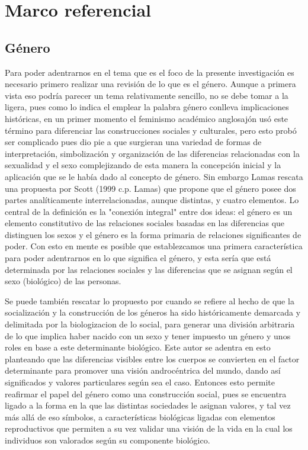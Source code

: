 \chapter{Marco referencial}\label{marcoreferencial}

\section{Género}

Para poder adentrarnos en el tema que es el foco de la presente investigación es
necesario primero realizar una revisión de lo que es el género. Aunque a primera
vista eso podría parecer un tema relativamente sencillo, no se debe tomar a la
ligera, pues como lo indica \textcite{Lamas1999} el emplear la palabra
género conlleva implicaciones históricas, en un primer momento el feminismo
académico anglosajón usó este término para diferenciar las construcciones
sociales y culturales, pero esto probó ser complicado pues dio pie a que
surgieran una variedad de formas de interpretación, simbolización y organización
de las diferencias relacionadas con la sexualidad y el sexo complejizando de
esta manera la concepción inicial y la aplicación que se le había dado al
concepto de género. Sin embargo Lamas rescata una propuesta por Scott (1999 c.p.
Lamas) que propone que el género posee dos partes analíticamente
interrelacionadas, aunque distintas, y cuatro elementos. Lo central de la
definición es la "conexión integral" entre dos ideas: el género es un elemento
constitutivo de las relaciones sociales basadas en las diferencias que
distinguen los sexos y el género es la forma primaria de relaciones
significantes de poder. Con esto en mente es posible que establezcamos una
primera característica para poder adentrarnos en lo que significa el género, y
esta sería que está determinada por las relaciones sociales y las diferencias
que se asignan según el sexo (biológico) de las personas.

Se puede también rescatar lo propuesto por \textcite{Bourdieu2000} cuando se
refiere al hecho de que la socialización y la construcción de los géneros ha
sido históricamente demarcada y delimitada por la biologizacion de lo social,
para generar una división arbitraria de lo que implica haber nacido con un sexo
y tener impuesto un género y unos roles en base a este determinante biológico.
Este autor se adentra en esto planteando que las diferencias visibles entre los
cuerpos se convierten en el factor determinante para promover una visión
androcéntrica del mundo, dando así significados y valores particulares según sea
el caso. Entonces esto permite reafirmar el papel del género como una
construcción social, pues se encuentra ligado a la forma en la que las distintas
sociedades le asignan valores, y tal vez más allá de eso símbolos, a
características biológicas ligadas con elementos reproductivos que permiten a su
vez validar una visión de la vida en la cual los individuos son valorados según
su componente biológico.


